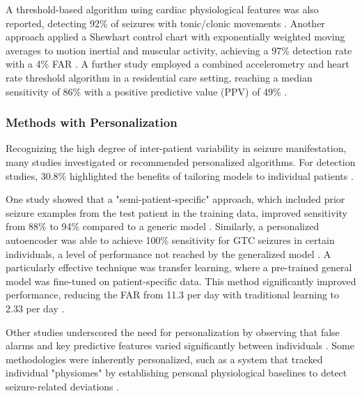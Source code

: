 A threshold-based algorithm using cardiac physiological features was also reported, detecting 92\% of seizures with tonic/clonic movements \cite{Hegarty-Craver2021-hk}. Another approach applied a Shewhart control chart with exponentially weighted moving averages to motion inertial and muscular activity, achieving a 97\% detection rate with a 4\% FAR \cite{Gheryani2017-yg}. A further study employed a combined accelerometry and heart rate threshold algorithm in a residential care setting, reaching a median sensitivity of 86\% with a positive predictive value (PPV) of 49\% \cite{Arends2018-ew}.


\subsubsection{Methods with Personalization}
Recognizing the high degree of inter-patient variability in seizure manifestation, many studies investigated or recommended personalized algorithms. For detection studies, 30.8\% highlighted the benefits of tailoring models to individual patients \cite{Yu2023-ss, Poh2012-af, Nasseri2021-xn, Milosevic2016-ee, Hamlin2021-sd, Jiang2022-zu, Hegarty-Craver2021-hk, Wang2025-ql}.

One study showed that a "semi-patient-specific" approach, which included prior seizure examples from the test patient in the training data, improved sensitivity from 88\% to 94\% compared to a generic model \cite{Poh2012-af}. Similarly, a personalized autoencoder was able to achieve 100\% sensitivity for GTC seizures in certain individuals, a level of performance not reached by the generalized model \cite{Yu2023-ss}. A particularly effective technique was transfer learning, where a pre-trained general model was fine-tuned on patient-specific data. This method significantly improved performance, reducing the FAR from 11.3 per day with traditional learning to 2.33 per day \cite{Nasseri2021-xn}.

Other studies underscored the need for personalization by observing that false alarms and key predictive features varied significantly between individuals \cite{Milosevic2016-ee, Hamlin2021-sd}. Some methodologies were inherently personalized, such as a system that tracked individual "physiomes" by establishing personal physiological baselines to detect seizure-related deviations \cite{Jiang2022-zu}.

